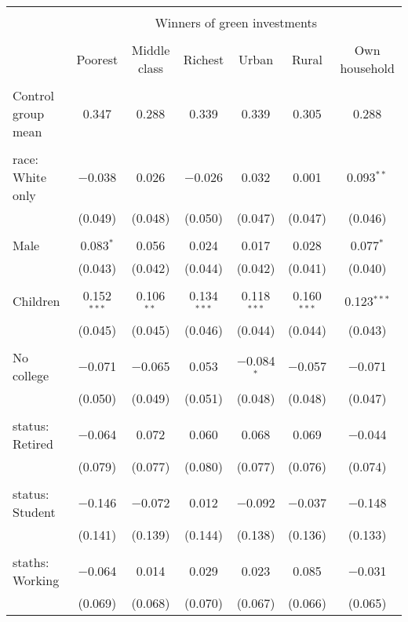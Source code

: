 
\begin{tabular}{@{\extracolsep{5pt}}lcccccc} 
\\[-1.8ex]\hline 
\hline \\[-1.8ex] 
 & \multicolumn{6}{c}{Winners of green investments} \\ 
\cline{2-7} 
\\[-1.8ex] & Poorest & Middle class & Richest & Urban & Rural & Own household \\ 
\hline \\[-1.8ex] 
 Control group mean & 0.347 & 0.288 & 0.339 & 0.339 & 0.305 & 0.288  \\ \hline \\[-1.8ex] race: White only & $-$0.038 & 0.026 & $-$0.026 & 0.032 & 0.001 & 0.093$^{**}$ \\ 
  & (0.049) & (0.048) & (0.050) & (0.047) & (0.047) & (0.046) \\ 
  & & & & & & \\ 
 Male & 0.083$^{*}$ & 0.056 & 0.024 & 0.017 & 0.028 & 0.077$^{*}$ \\ 
  & (0.043) & (0.042) & (0.044) & (0.042) & (0.041) & (0.040) \\ 
  & & & & & & \\ 
 Children & 0.152$^{***}$ & 0.106$^{**}$ & 0.134$^{***}$ & 0.118$^{***}$ & 0.160$^{***}$ & 0.123$^{***}$ \\ 
  & (0.045) & (0.045) & (0.046) & (0.044) & (0.044) & (0.043) \\ 
  & & & & & & \\ 
 No college & $-$0.071 & $-$0.065 & 0.053 & $-$0.084$^{*}$ & $-$0.057 & $-$0.071 \\ 
  & (0.050) & (0.049) & (0.051) & (0.048) & (0.048) & (0.047) \\ 
  & & & & & & \\ 
 status: Retired & $-$0.064 & 0.072 & 0.060 & 0.068 & 0.069 & $-$0.044 \\ 
  & (0.079) & (0.077) & (0.080) & (0.077) & (0.076) & (0.074) \\ 
  & & & & & & \\ 
 status: Student & $-$0.146 & $-$0.072 & 0.012 & $-$0.092 & $-$0.037 & $-$0.148 \\ 
  & (0.141) & (0.139) & (0.144) & (0.138) & (0.136) & (0.133) \\ 
  & & & & & & \\ 
 staths: Working & $-$0.064 & 0.014 & 0.029 & 0.023 & 0.085 & $-$0.031 \\ 
  & (0.069) & (0.068) & (0.070) & (0.067) & (0.066) & (0.065) \\ 

\end{tabular}
